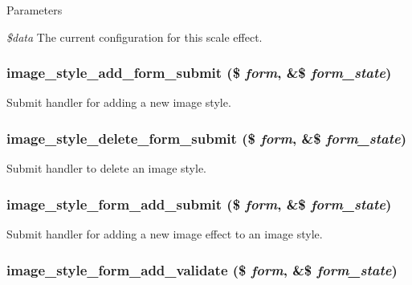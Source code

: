 \begin{DoxyParams}{Parameters}
\item[{\em \$data}]The current configuration for this scale effect. \end{DoxyParams}
\hypertarget{image_8admin_8inc_a31634c0c7dfaaf010ad5748f1c39ee15}{
\subsubsection[{image\_\-style\_\-add\_\-form\_\-submit}]{\setlength{\rightskip}{0pt plus 5cm}image\_\-style\_\-add\_\-form\_\-submit (\$ {\em form}, \/  \&\$ {\em form\_\-state})}}
\label{image_8admin_8inc_a31634c0c7dfaaf010ad5748f1c39ee15}
Submit handler for adding a new image style. \hypertarget{image_8admin_8inc_a9d81773b31a39889eaeb0acd77c72e60}{
\subsubsection[{image\_\-style\_\-delete\_\-form\_\-submit}]{\setlength{\rightskip}{0pt plus 5cm}image\_\-style\_\-delete\_\-form\_\-submit (\$ {\em form}, \/  \&\$ {\em form\_\-state})}}
\label{image_8admin_8inc_a9d81773b31a39889eaeb0acd77c72e60}
Submit handler to delete an image style. \hypertarget{image_8admin_8inc_abdd8225ec447cdd8af9b0b0a4629b2c9}{
\subsubsection[{image\_\-style\_\-form\_\-add\_\-submit}]{\setlength{\rightskip}{0pt plus 5cm}image\_\-style\_\-form\_\-add\_\-submit (\$ {\em form}, \/  \&\$ {\em form\_\-state})}}
\label{image_8admin_8inc_abdd8225ec447cdd8af9b0b0a4629b2c9}
Submit handler for adding a new image effect to an image style. \hypertarget{image_8admin_8inc_a9576207548aa3eb3c27ffc1caf679be5}{
\subsubsection[{image\_\-style\_\-form\_\-add\_\-validate}]{\setlength{\rightskip}{0pt plus 5cm}image\_\-style\_\-form\_\-add\_\-validate (\$ {\em form}, \/  \&\$ {\em form\_\-state})}}
